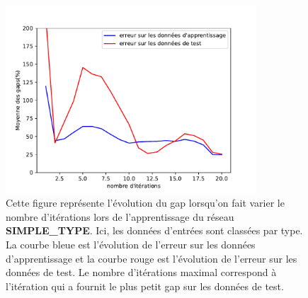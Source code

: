 \begin{figure}[H]
	\centerline{
		\includegraphics[height=7cm]{images_these/Gap_PROD_prediction_sequentialModel_test_valid_data__by_type.pdf}}
	\caption[Le gap du réseau SIMPLE\_TYPE]{Cette figure représente l'évolution du gap lorsqu'on fait varier le nombre d'itérations lors de l'apprentissage du réseau \textbf{SIMPLE\_TYPE}. Ici, les données d'entrées sont classées par type. La courbe bleue est l'évolution de l'erreur sur les données d'apprentissage et la courbe rouge est l'évolution de l'erreur sur les données de test. Le nombre d'itérations maximal correspond à l'itération qui a fournit le plus petit gap sur les données de test.}
	\label{6000_loss_sequentialModel_by_type_0}
\end{figure}



